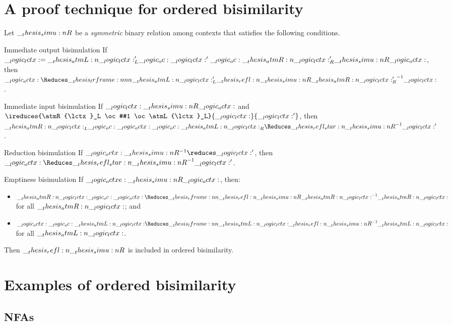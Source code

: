 \section{A proof technique for ordered bisimilarity}

\begin{theorem}
  Let $\__thesis_simu:n {R}$ be a \emph{symmetric} binary relation among contexts that satisfies the following conditions.
  \begin{thmdescription}
  \item[Immediate output bisimulation]
    If $\__logic_lctx: = \__thesis_atmL:n {\__logic_lctx:}'_L \__logic_oc: \__logic_lctx:' \__logic_oc: \__thesis_atmR:n {\__logic_lctx:}'_R \__thesis_simu:n {R} \__logic_octx:$, then $\octx \Reduces\lrframe{\atmL{\lctx}'_L}{\refl{\simu{R}}}{\atmR{\lctx}'_R}^{-1} \lctx$.
  \item[Immediate input bisimulation]
    If $\__logic_lctx: \__thesis_simu:n {R} \__logic_octx:$ and $\ireduces{\atmR{\lctx}_L \oc #1 \oc \atmL{\lctx}_L}{\lctx}{\lctx'}$, then $\atmR{\lctx}_L \oc \octx \oc \atmL{\lctx}_R \Reduces\refl*{\simu{R}}^{-1} \lctx'$.
  \item[Reduction bisimulation]
    If $\octx \simu{R}^{-1}\reduces \lctx'$, then $\octx \Reduces\refl*{\simu{R}}^{-1} \lctx'$.
  \item[Emptiness bisimulation]
    If $\__logic_octxe: \__thesis_simu:n {R} \__logic_octx:$, then:
    \begin{itemize}
    \item $\atmR{\lctx} \oc \octx \Reduces\rframe{\refl{\simu{R}}}{\atmR{\lctx}}^{-1} \atmR{\lctx}$ for all $\__thesis_atmR:n {\__logic_lctx:}$; and
    \item $\octx \oc \atmL{\lctx} \Reduces\lframe{\atmL{\lctx}}{\refl{\simu{R}}}^{-1} \atmL{\lctx}$ for all $\__thesis_atmL:n {\__logic_lctx:}$.
    \end{itemize}
  \end{thmdescription}
  Then $\refl{\simu{R}}$ is included in ordered bisimilarity.
\end{theorem}


\section{Examples of ordered bisimilarity}

\subsection{\Aclp*{NFA}}

